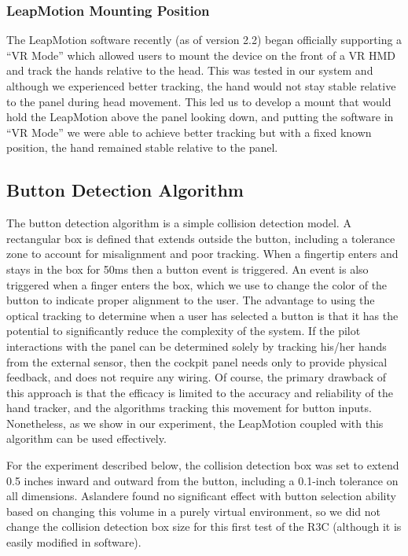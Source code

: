 \subsubsection{LeapMotion Mounting Position}
The LeapMotion software recently (as of version 2.2) began officially supporting a ``VR Mode'' which allowed users to mount the device on the front of a VR HMD and track the hands relative to the head.
This was tested in our system and although we experienced better tracking, the hand would not stay stable relative to the panel during head movement.
This led us to develop a mount that would hold the LeapMotion above the panel looking down, and putting the software in ``VR Mode'' we were able to achieve better tracking but with a fixed known position, the hand remained stable relative to the panel.

\subsection{Button Detection Algorithm}
\label{sec:pe_zone}

The button detection algorithm is a simple collision detection model.
A rectangular box is defined that extends outside the button, including a tolerance zone to account for misalignment and poor tracking.
When a fingertip enters and stays in the box for 50ms then a button event is triggered.
An event is also triggered when a finger enters the box, which we use to change the color of the button to indicate proper alignment to the user.
The advantage to using the optical tracking to determine when a user has selected a button is that it has the potential to significantly reduce the complexity of the system.
If the pilot interactions with the panel can be determined solely by tracking his/her hands from the external sensor, then the cockpit panel needs only to provide physical feedback, and does not require any wiring.
Of course, the primary drawback of this approach is that the efficacy is limited to the accuracy and reliability of the hand tracker, and the algorithms tracking this movement for button inputs.
Nonetheless, as we show in our experiment, the LeapMotion coupled with this algorithm can be used effectively.

For the experiment described below, the collision detection box was set to extend 0.5 inches inward and outward from the button, including a 0.1-inch tolerance on all dimensions.
Aslandere \cite{t._aslandere_virtual_2015} found no significant effect with button selection ability based on changing this volume in a purely virtual environment, so we did not change the collision detection box size for this first test of the R3C (although it is easily modified in software).

